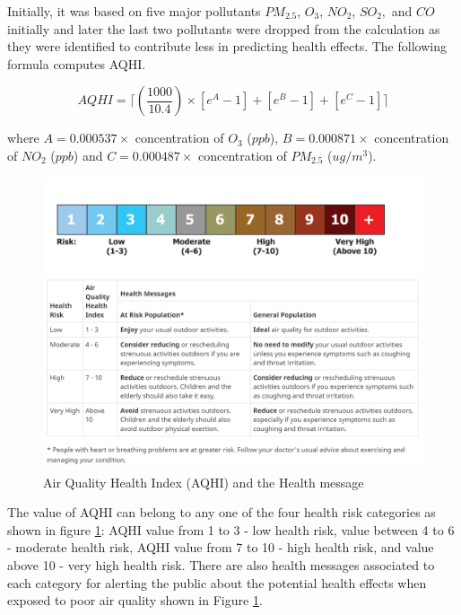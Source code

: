 Initially, it was based on five major pollutants $PM_{2.5}$, $O_3$, $NO_2$, $SO_2,$ and $CO$ initially and later the last two pollutants were dropped from the calculation as they were identified to contribute less in predicting health effects. The following formula computes AQHI.

\begin{equation}
AQHI = \lceil (\frac{1000}{10.4}) \times [e^A-1]+[e^B-1]+[e^C-1] \rceil
\end{equation}

where $ A = 0.000537 \times$ concentration of  $O_3$ ($ppb$), $B = 0.000871 \times$ concentration  of $NO_2$ ($ppb$) and  $C = 0.000487 \times$ concentration of $PM_{2.5}$ ($ug/m^3$).



\begin{figure}[h]
  \begin{center}
  \includegraphics[scale=0.31]{./images/figure103.png}
  \end{center}
 
  \caption{Air Quality Health Index (AQHI) and the Health message}
  
  \label{aqhi}
\end{figure}
\hspace{1 cm}


The value of AQHI can belong to any one of the four health risk categories as shown in figure \ref{aqhi}:
AQHI value from 1 to 3 - low health risk, value between 4 to 6 - moderate health risk, AQHI value from 7 to 10 - high health risk, and value above 10 - very high health risk. There are also health messages associated to each category for alerting the public about the potential health effects when exposed to poor air quality shown in Figure \ref{aqhi}.


